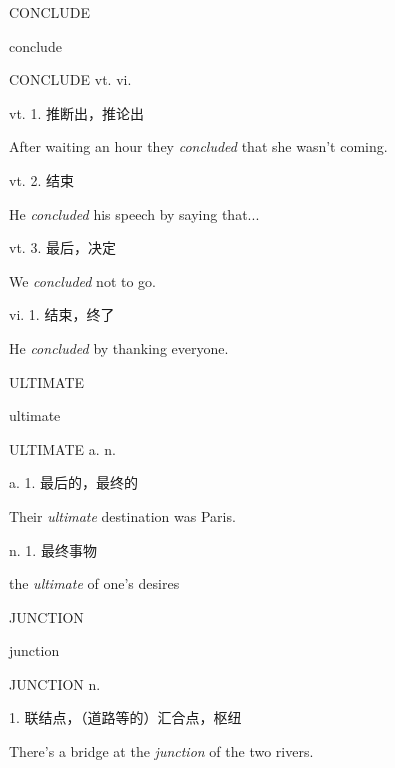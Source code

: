 \begin{flashcard}{
CONCLUDE

conclude
}
\begin{center}
CONCLUDE vt. vi. 
\end{center}
vt. 1. 推断出，推论出

After waiting an hour they \textit{concluded} that she wasn't coming.

vt. 2. 结束

He \textit{concluded} his speech by saying that...

vt. 3. 最后，决定

We \textit{concluded} not to go.

vi. 1. 结束，终了

He \textit{concluded} by thanking everyone.

\end{flashcard}
\begin{flashcard}{
ULTIMATE

ultimate
}
\begin{center}
ULTIMATE a. n. 
\end{center}
a. 1. 最后的，最终的

Their \textit{ultimate} destination was Paris.

n. 1. 最终事物

the \textit{ultimate} of one's desires

\end{flashcard}
\begin{flashcard}{
JUNCTION

junction
}
\begin{center}
JUNCTION n. 
\end{center}
1. 联结点，（道路等的）汇合点，枢纽

There's a bridge at the \textit{junction} of the two rivers.

\end{flashcard}
